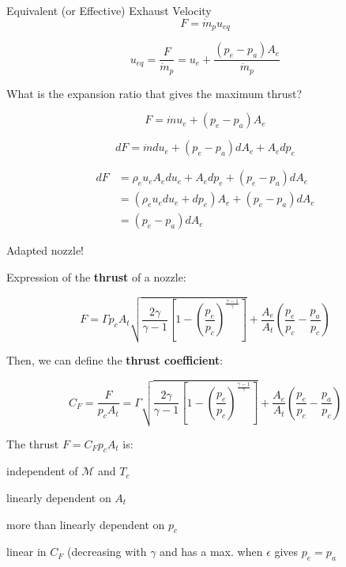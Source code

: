 \documentclass[
  ignorenonframetext,
]{beamer}
\begin{document}
\begin{frame}
\begin{block}{Equivalent (or Effective) Exhaust Velocity}
\protect\hypertarget{equivalent-or-effective-exhaust-velocity}{}
\[F = \dot{m}_p u_{eq}\]

\[u_{eq} = \frac{F}{\dot{m}_p} = u_e + \frac{(p_e - p_a)A_e}{\dot{m}_p}\]
\end{block}
\end{frame}

\begin{frame}
What is the expansion ratio that gives the maximum thrust?

\[F = \dot{m}u_e + (p_e - p_a)A_e\]

\[dF = \dot{m} du_e + (p_e - p_a)dA_e + A_e dp_e\]

\[
\begin{align*}
dF &= \rho_e u_e A_e du_e + A_e dp_e + (p_e - p_a) dA_e \\
   &= (\rho_e u_e du_e + dp_e) A_e + (p_e - p_a) dA_e \\
   &= (p_e - p_a) dA_e
\end{align*}
\]

{Adapted nozzle!}
\end{frame}

\begin{frame}
Expression of the \textbf{thrust} of a nozzle:

\begin{equation}
F = \Gamma p_c A_t \sqrt{\frac{2\gamma}{\gamma-1} \left[1 - \left(\frac{p_e}{p_c}\right)^\frac{\gamma-1}{\gamma}\right]} + \frac{A_e}{A_t} \left( \frac{p_e}{p_c} - \frac{p_a}{p_c} \right)
\end{equation}

Then, we can define the \textbf{thrust coefficient}:

\begin{equation}
C_F = \frac{F}{p_c A_t} = \Gamma \sqrt{\frac{2\gamma}{\gamma-1} \left[1 - \left(\frac{p_e}{p_c}\right)^\frac{\gamma-1}{\gamma}\right]} + \frac{A_e}{A_t} \left( \frac{p_e}{p_c} - \frac{p_a}{p_c} \right)
\end{equation}

The thrust \(F = C_F p_c A_t\) is:

independent of \(\mathcal{M}\) and \(T_c\)

linearly dependent on \(A_t\)

more than linearly dependent on \(p_c\)

linear in \(C_F\) (decreasing with \(\gamma\) and has a max. when
\(\epsilon\) gives \(p_e = p_a\)
\end{frame}
\end{document}
